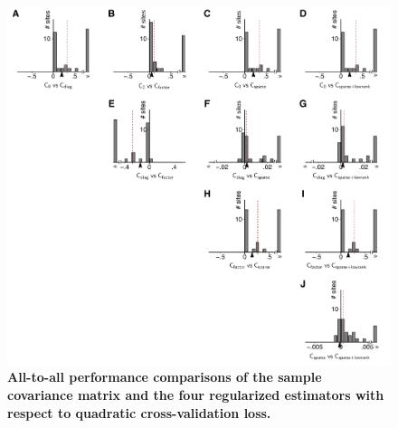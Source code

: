 \documentclass[10pt]{article}
\begin{document}
\begin{figure}[!ht]
\begin{center}
\includegraphics{./figures/Figure-Supp02.pdf}
\end{center}
\caption{{\bf All-to-all performance comparisons of the sample covariance matrix and the four regularized estimators with respect to quadratic cross-validation loss.}
}
\label{supp:02}
\end{figure}
\end{document}
